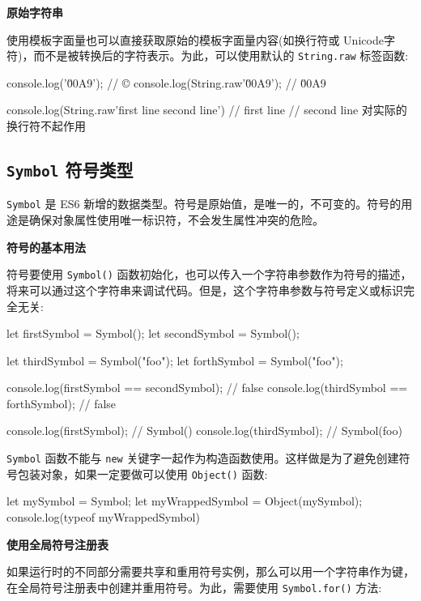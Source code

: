 \noindent\textbf{原始字符串}

使用模板字面量也可以直接获取原始的模板字面量内容(如换行符或 Unicode字符)，而不是被转换后的字符表示。为此，可以使用默认的 \texttt{String.raw} 标签函数:

\begin{JavaScript}
console.log('\u00A9');              // ©
console.log(String.raw'\u00A9');    // \u00A9

console.log(String.raw'first line
second line')     
// first line
// second line 对实际的换行符不起作用
\end{JavaScript}

\subsection{\texttt{Symbol} 符号类型}

\texttt{Symbol} 是 ES6 新增的数据类型。符号是原始值，是唯一的，不可变的。符号的用途是确保对象属性使用唯一标识符，不会发生属性冲突的危险。

\noindent\textbf{符号的基本用法}

符号要使用 \texttt{Symbol()} 函数初始化，也可以传入一个字符串参数作为符号的描述，将来可以通过这个字符串来调试代码。但是，这个字符串参数与符号定义或标识完全无关:

\begin{JavaScript}
let firstSymbol = Symbol();
let secondSymbol = Symbol();

let thirdSymbol = Symbol("foo");
let forthSymbol = Symbol("foo");

console.log(firstSymbol == secondSymbol);   // false
console.log(thirdSymbol == forthSymbol);    // false

console.log(firstSymbol);    // Symbol()
console.log(thirdSymbol);    // Symbol(foo)
\end{JavaScript}

\texttt{Symbol} 函数不能与 \texttt{new} 关键字一起作为构造函数使用。这样做是为了避免创建符号包装对象，如果一定要做可以使用 \texttt{Object()} 函数:

\begin{JavaScript}
let mySymbol = Symbol;
let myWrappedSymbol = Object(mySymbol);
console.log(typeof myWrappedSymbol)
\end{JavaScript}

\noindent\textbf{使用全局符号注册表}

如果运行时的不同部分需要共享和重用符号实例，那么可以用一个字符串作为键，在全局符号注册表中创建并重用符号。为此，需要使用 \texttt{Symbol.for()} 方法:

